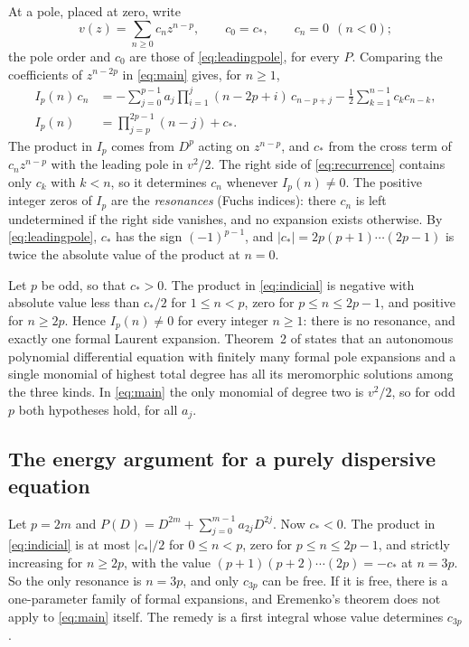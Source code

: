 At a pole, placed at zero, write
\begin{equation}\label{eq:laurent}
 v(z)=\sum_{n\ge0}c_nz^{n-p},\qquad c_0=c_\ast,\qquad c_n=0\ \ (n<0);
\end{equation}
the pole order and \(c_0\) are those of \eqref{eq:leadingpole}, for
every \(P\). Comparing the coefficients of \(z^{n-2p}\) in
\eqref{eq:main} gives, for \(n\ge1\),
\begin{align}
 I_p(n)\,c_n&=-\sum_{j=0}^{p-1}a_j\prod_{i=1}^{j}(n-2p+i)\,c_{n-p+j}
 -\frac12\sum_{k=1}^{n-1}c_kc_{n-k},\label{eq:recurrence}\\
 I_p(n)&=\prod_{j=p}^{2p-1}(n-j)+c_\ast.\label{eq:indicial}
\end{align}
The product in \(I_p\) comes from \(D^p\) acting on \(z^{n-p}\), and
\(c_\ast\) from the cross term of \(c_nz^{n-p}\) with the leading pole
in \(v^2/2\). The right side of \eqref{eq:recurrence} contains only
\(c_k\) with \(k<n\), so it determines \(c_n\) whenever \(I_p(n)\ne0\).
The positive integer zeros of \(I_p\) are the \emph{resonances} (Fuchs
indices): there \(c_n\) is left undetermined if the right side vanishes,
and no expansion exists otherwise. By \eqref{eq:leadingpole}, \(c_\ast\)
has the sign \((-1)^{p-1}\), and \(|c_\ast|=2p(p+1)\cdots(2p-1)\) is
twice the absolute value of the product at \(n=0\).

Let \(p\) be odd, so that \(c_\ast>0\). The product in
\eqref{eq:indicial} is negative with absolute value less than
\(c_\ast/2\) for \(1\le n<p\), zero for \(p\le n\le2p-1\), and positive
for \(n\ge2p\). Hence \(I_p(n)\ne0\) for every integer \(n\ge1\): there
is no resonance, and exactly one formal Laurent expansion. Theorem~2 of
\citet{Eremenko2006} states that an autonomous polynomial differential
equation with finitely many formal pole expansions and a single monomial
of highest total degree has all its meromorphic solutions among the
three kinds. In \eqref{eq:main} the only monomial of degree two is
\(v^2/2\), so for odd \(p\) both hypotheses hold, for all \(a_j\).

\subsection{The energy argument for a purely dispersive equation}

Let \(p=2m\) and \(P(D)=D^{2m}+\sum_{j=0}^{m-1}a_{2j}D^{2j}\). Now
\(c_\ast<0\). The product in \eqref{eq:indicial} is at most
\(|c_\ast|/2\) for \(0\le n<p\), zero for \(p\le n\le2p-1\), and
strictly increasing for \(n\ge2p\), with the value
\((p+1)(p+2)\cdots(2p)=-c_\ast\) at \(n=3p\). So the only resonance is
\(n=3p\), and only \(c_{3p}\) can be free. If it is free, there is a
one-parameter family of formal expansions, and Eremenko's theorem does
not apply to \eqref{eq:main} itself. The remedy is a first integral
whose value determines \(c_{3p}\).

